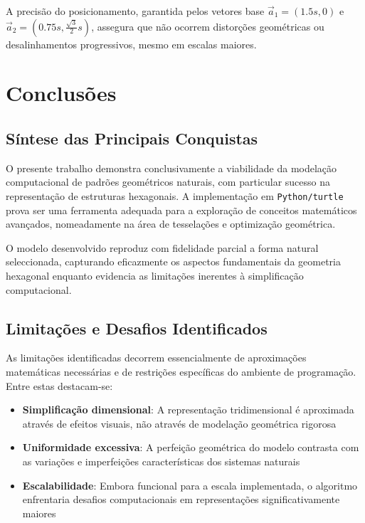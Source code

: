 \documentclass[12pt,a4paper,oneside]{extarticle}
\begin{document}
A precisão do posicionamento, garantida pelos vetores base $\vec{a}_1 = (1.5s, 0)$ e $\vec{a}_2 = (0.75s, \frac{\sqrt{3}}{2}s)$, assegura que não ocorrem distorções geométricas ou desalinhamentos progressivos, mesmo em escalas maiores.


\section{Conclusões}

\subsection{Síntese das Principais Conquistas}

O presente trabalho demonstra conclusivamente a viabilidade da modelação computacional de padrões geométricos naturais, com particular sucesso na representação de estruturas hexagonais. A implementação em \texttt{Python/turtle} prova ser uma ferramenta adequada para a exploração de conceitos matemáticos avançados, nomeadamente na área de tesselações e optimização geométrica.

O modelo desenvolvido reproduz com fidelidade parcial a forma natural seleccionada, capturando eficazmente os aspectos fundamentais da geometria hexagonal enquanto evidencia as limitações inerentes à simplificação computacional.

\subsection{Limitações e Desafios Identificados}

As limitações identificadas decorrem essencialmente de aproximações matemáticas necessárias e de restrições específicas do ambiente de programação. Entre estas destacam-se:

\begin{itemize}
    \item \textbf{Simplificação dimensional}: A representação tridimensional é aproximada através de efeitos visuais, não através de modelação geométrica rigorosa
    \item \textbf{Uniformidade excessiva}: A perfeição geométrica do modelo contrasta com as variações e imperfeições características dos sistemas naturais
    \item \textbf{Escalabilidade}: Embora funcional para a escala implementada, o algoritmo enfrentaria desafios computacionais em representações significativamente maiores
\end{itemize}
\end{document}
